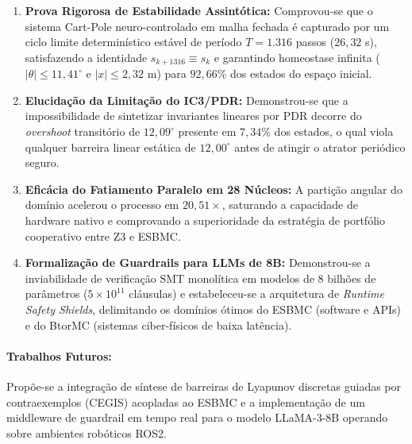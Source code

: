 \documentclass[11pt,a4paper]{article}
\theoremstyle{definition}
\begin{document}
\begin{enumerate}
    \item \textbf{Prova Rigorosa de Estabilidade Assintótica:} Comprovou-se que o sistema Cart-Pole neuro-controlado em malha fechada é capturado por um ciclo limite determinístico estável de período $T = 1.316$ passos ($26{,}32$ s), satisfazendo a identidade $s_{k+1316} \equiv s_k$ e garantindo homeostase infinita ($|\theta| \le 11{,}41^\circ$ e $|x| \le 2{,}32$ m) para $92{,}66\%$ dos estados do espaço inicial.
    \item \textbf{Elucidação da Limitação do IC3/PDR:} Demonstrou-se que a impossibilidade de sintetizar invariantes lineares por PDR decorre do \textit{overshoot} transitório de $12{,}09^\circ$ presente em $7{,}34\%$ dos estados, o qual viola qualquer barreira linear estática de $12{,}00^\circ$ antes de atingir o atrator periódico seguro.
    \item \textbf{Eficácia do Fatiamento Paralelo em 28 Núcleos:} A partição angular do domínio acelerou o processo em $20{,}51\times$, saturando a capacidade de hardware nativo e comprovando a superioridade da estratégia de portfólio cooperativo entre Z3 e ESBMC.
    \item \textbf{Formalização de Guardrails para LLMs de 8B:} Demonstrou-se a inviabilidade de verificação SMT monolítica em modelos de 8 bilhões de parâmetros ($5 \times 10^{11}$ cláusulas) e estabeleceu-se a arquitetura de \textit{Runtime Safety Shields}, delimitando os domínios ótimos do ESBMC (software e APIs) e do BtorMC (sistemas ciber-físicos de baixa latência).
\end{enumerate}

\paragraph{Trabalhos Futuros:} Propõe-se a integração de síntese de barreiras de Lyapunov discretas guiadas por contraexemplos (CEGIS) acopladas ao ESBMC e a implementação de um middleware de guardrail em tempo real para o modelo LLaMA-3-8B operando sobre ambientes robóticos ROS2.
\end{document}
